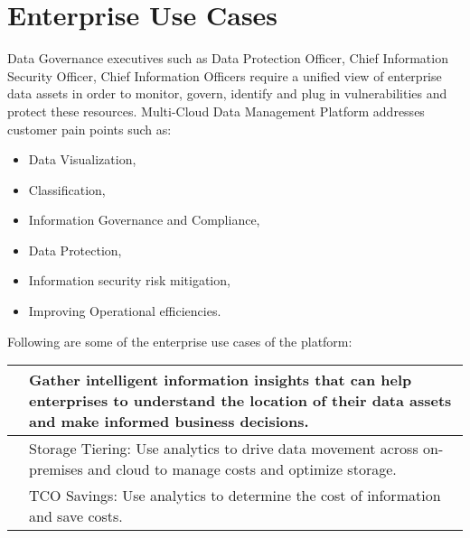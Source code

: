 \documentclass[letterpaper,10pt,english]{sphinxhowto}
\begin{document}
\section{Enterprise Use Cases}
\label{\detokenize{col/ds/mcdmp_ds_alpha1:enterprise-use-cases}}
Data Governance executives such as Data Protection Officer, Chief Information Security Officer, Chief Information Officers require a unified view of enterprise data assets in order to monitor, govern, identify and plug in vulnerabilities and protect these resources. Multi-Cloud Data Management Platform addresses customer pain points such as:
\begin{itemize}
\item {} 
Data Visualization,

\item {} 
Classification,

\item {} 
Information Governance and Compliance,

\item {} 
Data Protection,

\item {} 
Information security risk mitigation,

\item {} 
Improving Operational efficiencies.

\end{itemize}

Following are some of the enterprise use cases of the platform:


\begin{savenotes}\sphinxattablestart
\centering
\begin{tabulary}{\linewidth}[t]{|l|L|}
\hline

&
Gather intelligent information insights that can help enterprises to understand the
location of their data assets and make informed business decisions.
\\
\hline{}%
&
Storage Tiering: Use analytics to drive data movement across on-premises and cloud
to manage costs and optimize storage.
\\
&
TCO Savings: Use analytics to determine the cost of information and save costs.
\\
\hline
\end{tabulary}
\par
\sphinxattableend\end{savenotes}
\end{document}
